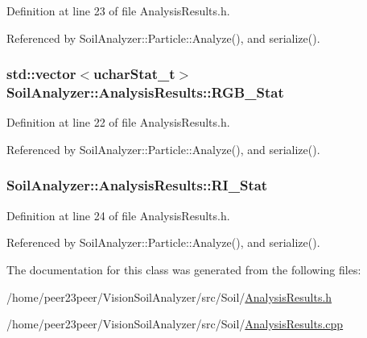 Definition at line 23 of file Analysis\+Results.\+h.



Referenced by Soil\+Analyzer\+::\+Particle\+::\+Analyze(), and serialize().

\hypertarget{class_soil_analyzer_1_1_analysis_results_ab35eca5f2cfca4b80797cfc314d5cdf5}{}
\subsubsection[{R\+G\+B\+\_\+\+Stat}]{\setlength{\rightskip}{0pt plus 5cm}std\+::vector$<${\bf uchar\+Stat\+\_\+t}$>$ Soil\+Analyzer\+::\+Analysis\+Results\+::\+R\+G\+B\+\_\+\+Stat}\label{class_soil_analyzer_1_1_analysis_results_ab35eca5f2cfca4b80797cfc314d5cdf5}


Definition at line 22 of file Analysis\+Results.\+h.



Referenced by Soil\+Analyzer\+::\+Particle\+::\+Analyze(), and serialize().

\hypertarget{class_soil_analyzer_1_1_analysis_results_a3bbccb36afd62b9a35b7afa578c4919d}{}
\subsubsection[{R\+I\+\_\+\+Stat}]{ Soil\+Analyzer\+::\+Analysis\+Results\+::\+R\+I\+\_\+\+Stat}\label{class_soil_analyzer_1_1_analysis_results_a3bbccb36afd62b9a35b7afa578c4919d}


Definition at line 24 of file Analysis\+Results.\+h.



Referenced by Soil\+Analyzer\+::\+Particle\+::\+Analyze(), and serialize().



The documentation for this class was generated from the following files\+:\begin{DoxyCompactItemize}
\item 
/home/peer23peer/\+Vision\+Soil\+Analyzer/src/\+Soil/\hyperlink{_analysis_results_8h}{Analysis\+Results.\+h}\item 
/home/peer23peer/\+Vision\+Soil\+Analyzer/src/\+Soil/\hyperlink{_analysis_results_8cpp}{Analysis\+Results.\+cpp}\end{DoxyCompactItemize}
